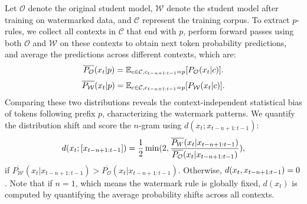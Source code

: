 Let $\mathcal{O}$ denote the original student model, $\mathcal{W}$ denote the student model after training on watermarked data, and $\mathcal{C}$ represent the training corpus. To extract $p$-rules, we collect all contexts in $\mathcal{C}$ that end with $p$, perform forward passes using both $\mathcal{O}$ and $\mathcal{W}$ on these contexts to obtain next token probability predictions, and average the predictions across different contexts, which are:
\begin{equation}
    \small
    \overline{P_\mathcal{O}}(x_t|p) = \mathbb{E}_{c \in \mathcal{C}, c_{t-n+1:t-1}=p}[P_\mathcal{O}(x_t | c)].
\end{equation}
\begin{equation}
    \small
    \overline{P_\mathcal{W}}(x_t|p) = \mathbb{E}_{c \in \mathcal{C}, c_{t-n+1:t-1}=p}[P_\mathcal{W}(x_t | c)].
\end{equation}
Comparing these two distributions reveals the context-independent statistical bias of tokens following prefix $p$, characterizing the watermark patterns. We quantify the distribution shift and score the $n$-gram using $d(x_t; x_{t-n+1:t-1})$:
\begin{equation}
    \small
    d(x_t; [x_{t-n+1:t-1}]) = \frac{1}{2} \min (2, \frac{\overline{P_W}(x_t|x_{t-n+1:t-1})}{\overline{P_\mathcal{O}}(x_t|x_{t-n+1:t-1})}),
\end{equation}
if $\overline{P_\mathcal{W}}(x_t|x_{t-n+1:t-1}) > \overline{P_\mathcal{O}}(x_t|x_{t-n+1:t-1})$. Otherwise, $\small d(x_t, x_{t-n+1:t-1})=0$. Note that if $n=1$, which means the watermark rule is globally fixed, $d(x_t)$ is computed by quantifying the average probability shifts across all contexts.

\vspace{3pt}

